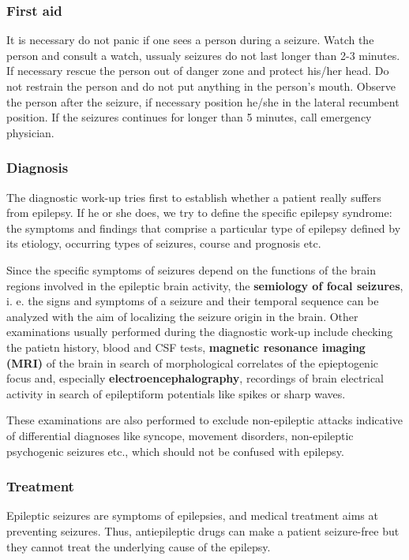 \documentclass[12pt,article,oneside,a4paper]{memoir}
\begin{document}
\subsubsection{First aid}
It is necessary do not panic if one sees a person during a seizure. Watch the person and consult a watch, ussualy seizures do not last longer than 2-3 minutes. If necessary rescue the person out of danger zone and protect his/her head.
Do not restrain the person and do not put anything in the person's mouth. Observe the person after the seizure, if necessary position he/she in the lateral recumbent position. If the seizures continues for longer than 5 minutes, call emergency physician.

\subsubsection{Diagnosis}

The diagnostic work-up tries first to establish whether a patient really suffers from epilepsy. If he or she does, we try to define the specific epilepsy syndrome: the symptoms and findings that comprise a particular type of epilepsy defined by its etiology, occurring types of seizures, course and prognosis etc.

Since the specific symptoms of seizures depend on the functions of the brain regions involved in the epileptic brain activity, the \textbf{semiology of focal seizures}, i. e. the signs and symptoms of a seizure and their temporal sequence can be analyzed with the aim of localizing the seizure origin in the brain.
Other examinations usually performed during the diagnostic work-up include checking the patietn history, blood and CSF tests, \textbf{magnetic resonance imaging (MRI)} of the brain in search of morphological correlates of the epieptogenic focus and, especially \textbf{electroencephalography}, recordings of brain electrical activity in search of epileptiform potentials like spikes or sharp waves.

These examinations are also performed to exclude non-epileptic attacks indicative of differential diagnoses like syncope, movement disorders, non-epileptic psychogenic seizures etc., which should not be confused with epilepsy.

\subsubsection{Treatment}

Epileptic seizures are symptoms of epilepsies, and medical treatment aims at preventing seizures. Thus, antiepileptic drugs can make a patient seizure-free but they cannot treat the underlying cause of the epilepsy. 
\end{document}
